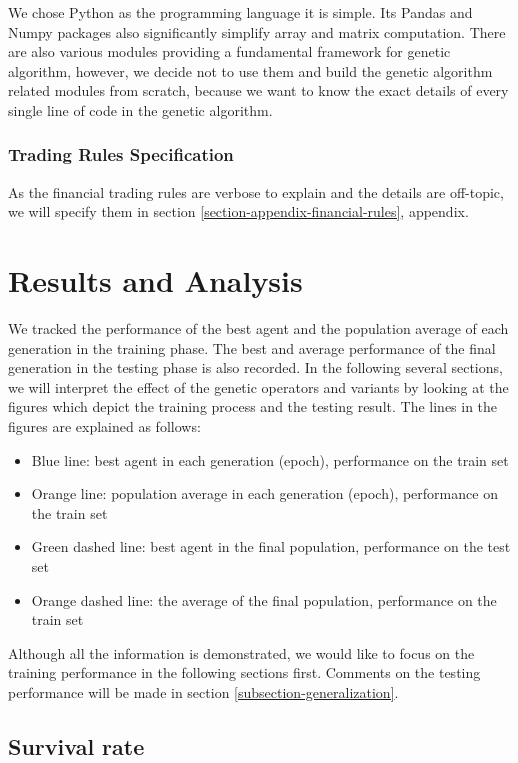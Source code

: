 \documentclass{article}
\begin{document}
We chose Python as the programming language it is simple.
Its Pandas and Numpy packages also significantly simplify array and matrix computation.
There are also various modules providing a fundamental framework for genetic algorithm,
however, we decide not to use them and build the genetic algorithm related modules from scratch,
because we want to know the exact details of every single line of code
in the genetic algorithm.

\subsubsection{Trading Rules Specification}

As the financial trading rules are verbose to explain and the details are off-topic,
we will specify them in section \ref{section-appendix-financial-rules}, appendix.

\section{Results and Analysis}

We tracked the performance of the best agent and
the population average of each generation in the training phase.
The best and average performance of the final generation in the testing phase is also recorded.
In the following several sections,
we will interpret the effect of the genetic operators and variants
by looking at the figures which depict the training process and the testing result.
The lines in the figures are explained as follows:
\begin{itemize}
    \item Blue line: best agent in each generation (epoch), performance on the train set
    \item Orange line: population average in each generation (epoch), performance on the train set
    \item Green dashed line: best agent in the final population, performance on the test set
    \item Orange dashed line: the average of the final population, performance on the train set
\end{itemize}

Although all the information is demonstrated,
we would like to focus on the training performance in the following sections first.
Comments on the testing performance will be made in section \ref{subsection-generalization}.

\subsection{Survival rate}
\end{document}
